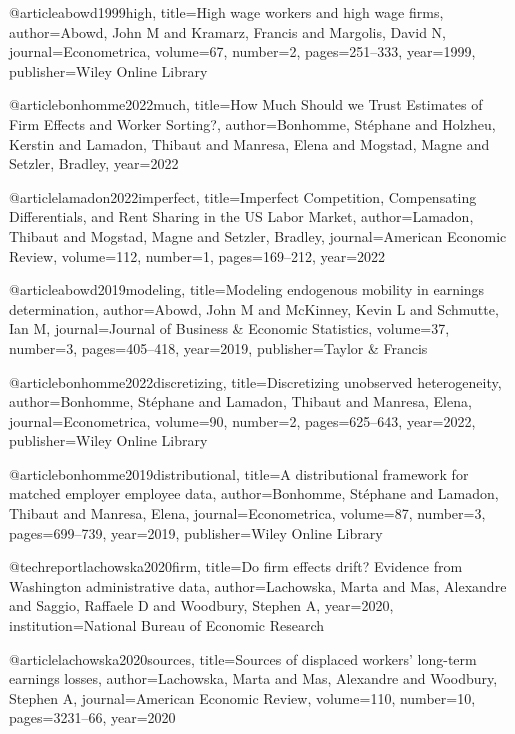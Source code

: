 
@article{abowd1999high,
  title={High wage workers and high wage firms},
  author={Abowd, John M and Kramarz, Francis and Margolis, David N},
  journal={Econometrica},
  volume={67},
  number={2},
  pages={251--333},
  year={1999},
  publisher={Wiley Online Library}
}

@article{bonhomme2022much,
  title={How Much Should we Trust Estimates of Firm Effects and Worker Sorting?},
  author={Bonhomme, St{\'e}phane and Holzheu, Kerstin and Lamadon, Thibaut and Manresa, Elena and Mogstad, Magne and Setzler, Bradley},
  year={2022}
}

@article{lamadon2022imperfect,
  title={Imperfect Competition, Compensating Differentials, and Rent Sharing in the US Labor Market},
  author={Lamadon, Thibaut and Mogstad, Magne and Setzler, Bradley},
  journal={American Economic Review},
  volume={112},
  number={1},
  pages={169--212},
  year={2022}
}

@article{abowd2019modeling,
  title={Modeling endogenous mobility in earnings determination},
  author={Abowd, John M and McKinney, Kevin L and Schmutte, Ian M},
  journal={Journal of Business \& Economic Statistics},
  volume={37},
  number={3},
  pages={405--418},
  year={2019},
  publisher={Taylor \& Francis}
}

@article{bonhomme2022discretizing,
  title={Discretizing unobserved heterogeneity},
  author={Bonhomme, St{\'e}phane and Lamadon, Thibaut and Manresa, Elena},
  journal={Econometrica},
  volume={90},
  number={2},
  pages={625--643},
  year={2022},
  publisher={Wiley Online Library}
}

@article{bonhomme2019distributional,
  title={A distributional framework for matched employer employee data},
  author={Bonhomme, St{\'e}phane and Lamadon, Thibaut and Manresa, Elena},
  journal={Econometrica},
  volume={87},
  number={3},
  pages={699--739},
  year={2019},
  publisher={Wiley Online Library}
}

@techreport{lachowska2020firm,
  title={Do firm effects drift? Evidence from Washington administrative data},
  author={Lachowska, Marta and Mas, Alexandre and Saggio, Raffaele D and Woodbury, Stephen A},
  year={2020},
  institution={National Bureau of Economic Research}
}

@article{lachowska2020sources,
  title={Sources of displaced workers' long-term earnings losses},
  author={Lachowska, Marta and Mas, Alexandre and Woodbury, Stephen A},
  journal={American Economic Review},
  volume={110},
  number={10},
  pages={3231--66},
  year={2020}
}

